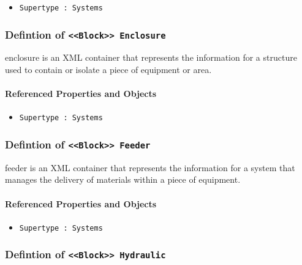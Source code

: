 \begin{itemize}
\item \texttt{Supertype : Systems}

\end{itemize}
\FloatBarrier
\subsubsection{Defintion of \texttt{<<Block>> Enclosure}}
  \label{type:Enclosure}

\FloatBarrier

enclosure is an XML container that represents the information for a structure used to contain or isolate a piece of equipment or area.

\FloatBarrier
\paragraph{Referenced Properties and Objects}

\begin{itemize}
\item \texttt{Supertype : Systems}

\end{itemize}
\FloatBarrier
\subsubsection{Defintion of \texttt{<<Block>> Feeder}}
  \label{type:Feeder}

\FloatBarrier

feeder is an XML container that represents the information for a system that manages the delivery of materials within a piece of equipment.

\FloatBarrier
\paragraph{Referenced Properties and Objects}

\begin{itemize}
\item \texttt{Supertype : Systems}

\end{itemize}
\FloatBarrier
\subsubsection{Defintion of \texttt{<<Block>> Hydraulic}}
  \label{type:Hydraulic}

\FloatBarrier

